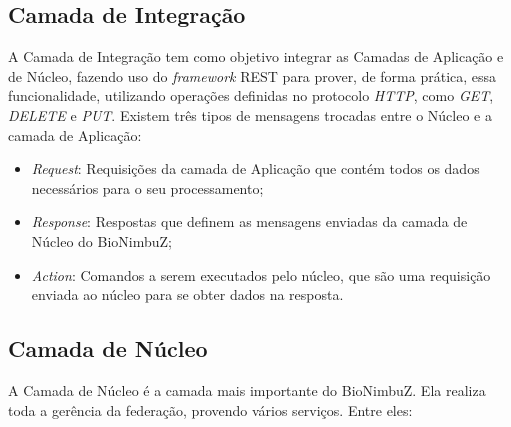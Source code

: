 \subsection{Camada de Integração} A Camada de Integração tem como objetivo integrar as Camadas de Aplicação e de Núcleo, fazendo uso do \textit{framework} \acrshort{REST} para prover, de forma prática, essa funcionalidade, utilizando operações definidas no protocolo \textit{HTTP}, como \textit{GET}, \textit{DELETE} e \textit{PUT}.
Existem três tipos de mensagens trocadas entre o Núcleo e a camada de Aplicação:
\begin{itemize}
	\item \textit{Request}: Requisições da camada de Aplicação que contém todos os dados necessários para o seu processamento;
	\item \textit{Response}: Respostas que definem as mensagens enviadas da camada de Núcleo do BioNimbuZ;
	\item \textit{Action}: Comandos a serem executados pelo núcleo, que são uma requisição enviada ao núcleo para se obter dados na resposta.
\end{itemize}
	
	\subsection{Camada de Núcleo} A Camada de Núcleo é a camada mais importante do BioNimbuZ. Ela realiza toda a gerência da federação, provendo vários serviços. Entre eles:

